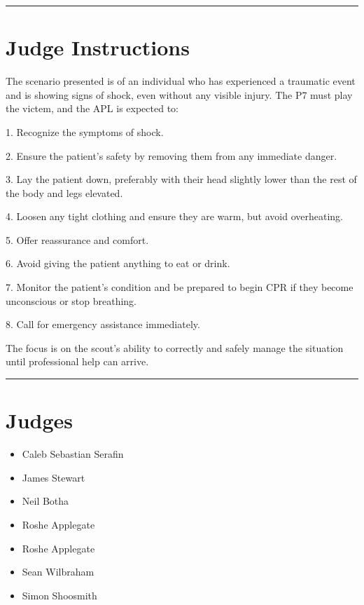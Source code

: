 \documentclass[10pt]{article}
\begin{document}
	\vspace{0.5cm}
	\hrule
	\vspace{0.5cm}

		\section*{Judge Instructions}
		The scenario presented is of an individual who has experienced a traumatic event and is showing signs of shock, even without any visible injury. The P7 must play the victem, and the APL is expected to:



1. Recognize the symptoms of shock.

2. Ensure the patient's safety by removing them from any immediate danger.

3. Lay the patient down, preferably with their head slightly lower than the rest of the body and legs elevated.

4. Loosen any tight clothing and ensure they are warm, but avoid overheating.

5. Offer reassurance and comfort.

6. Avoid giving the patient anything to eat or drink.

7. Monitor the patient's condition and be prepared to begin CPR if they become unconscious or stop breathing.

8. Call for emergency assistance immediately.



The focus is on the scout's ability to correctly and safely manage the situation until professional help can arrive.


\vspace{0.5cm}
	\hrule
	\vspace{0.5cm}
		\section*{\faUsers \: Judges}

		

	\begin{multicols}{2}

		\begin{itemize}
									\item Caleb Sebastian Serafin
									\item James Stewart
									\item Neil Botha
									\item Roshe Applegate
						\end{itemize}

		\vfill\null
		\columnbreak

		\begin{itemize}
									\item Roshe Applegate
									\item Sean Wilbraham
									\item Simon Shoosmith
						\end{itemize}

		\vfill\null

		\end{multicols}
\end{document}
